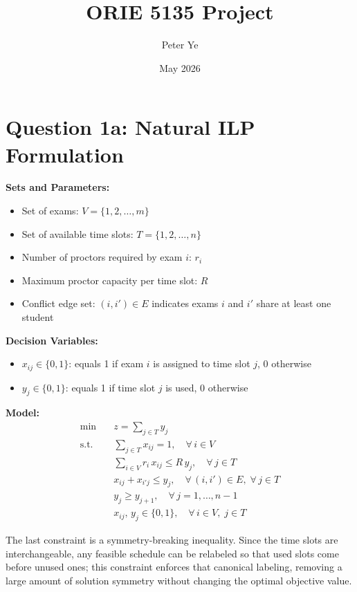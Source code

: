\documentclass{article}
\title{ORIE 5135 Project}
\author{Peter Ye}
\date{May 2026}
\begin{document}
\maketitle

\section{Question 1a: Natural ILP Formulation}

\textbf{Sets and Parameters:}
\begin{itemize}
    \item Set of exams: $V = \{1, 2, \dots, m\}$
    \item Set of available time slots: $T = \{1, 2, \dots, n\}$
    \item Number of proctors required by exam $i$: $r_i$
    \item Maximum proctor capacity per time slot: $R$
    \item Conflict edge set: $(i, i') \in E$ indicates exams $i$ and $i'$ share at least one student
\end{itemize}

\textbf{Decision Variables:}
\begin{itemize}
    \item $x_{ij} \in \{0,1\}$: equals 1 if exam $i$ is assigned to time slot $j$, 0 otherwise
    \item $y_j \in \{0,1\}$: equals 1 if time slot $j$ is used, 0 otherwise
\end{itemize}

\textbf{Model:}
\begin{align}
\min \quad & z = \sum_{j \in T} y_j \\
\text{s.t.} \quad & \sum_{j \in T} x_{ij} = 1, \quad \forall\, i \in V \\
& \sum_{i \in V} r_i\, x_{ij} \leq R\, y_j, \quad \forall\, j \in T \\
& x_{ij} + x_{i'j} \leq y_j, \quad \forall\, (i,i') \in E,\; \forall\, j \in T \\
& y_j \geq y_{j+1}, \quad \forall\, j = 1, \dots, n-1 \\
& x_{ij},\, y_j \in \{0,1\}, \quad \forall\, i \in V,\; j \in T
\end{align}

The last constraint is a symmetry-breaking inequality. Since the time slots are
interchangeable, any feasible schedule can be relabeled so that used slots come
before unused ones; this constraint enforces that canonical labeling, removing a
large amount of solution symmetry without changing the optimal objective value.
\end{document}
